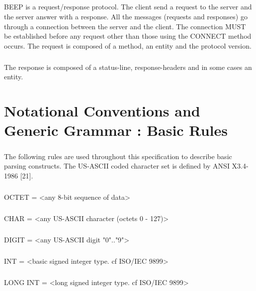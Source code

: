         \paragraph{}
BEEP is a request/response protocol. The client send a request to the
server and the server answer with a response. All the messages
(requests and responses) go through a connection between the server
and the client. The connection MUST be established before any request
other than those using the CONNECT method occurs.
The request is composed of a method, an entity and the protocol
version.
        \paragraph{}
The response is composed of a status-line, response-headers and in
some cases an entity.


    \clearpage
\chapter{Notational Conventions and Generic Grammar : Basic Rules}
    \paragraph{}
The following rules are used throughout this specification to
describe basic parsing constructs. The US-ASCII coded character set
is defined by ANSI X3.4-1986 [21].
    \paragraph{}
OCTET          = <any 8-bit sequence of data>
    \paragraph{}
CHAR           = <any US-ASCII character (octets 0 - 127)>
    \paragraph{}
DIGIT          = <any US-ASCII digit "0".."9">
    \paragraph{}
INT            = <basic signed integer type. cf ISO/IEC 9899>
    \paragraph{}
LONG INT       = <long signed integer type. cf ISO/IEC 9899>
